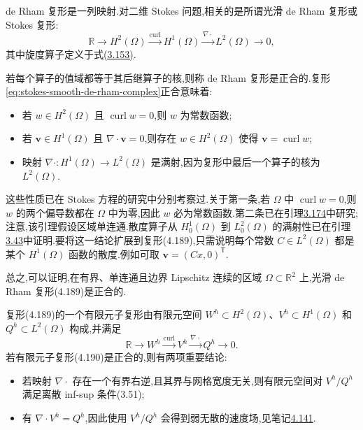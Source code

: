 \begin{note}\label{note:stokes-smooth-de-rham-complex}
de Rham 复形是一列映射.对二维 Stokes 问题,相关的是所谓光滑 de Rham 复形或 Stokes 复形:
\begin{equation}\label{eq:stokes-smooth-de-rham-complex}
  \mathbb{R}\longrightarrow H^2(\Omega)
  \xrightarrow{\operatorname{curl}}H^1(\Omega)
  \xrightarrow{\nabla\cdot}L^2(\Omega)\longrightarrow 0,
\end{equation}
其中旋度算子定义于式\hyperref[eq:curl-vector-2d]{(3.153)}.

若每个算子的值域都等于其后继算子的核,则称 de Rham 复形是正合的.复形\cref{eq:stokes-smooth-de-rham-complex}正合意味着:
\begin{itemize}
  \item 若 $w\in H^2(\Omega)$ 且 $\operatorname{curl}w=0$,则 $w$ 为常数函数;
  \item 若 $\bm{v}\in H^1(\Omega)$ 且 $\nabla\cdot\bm{v}=0$,则存在 $w\in H^2(\Omega)$ 使得 $\bm{v}=\operatorname{curl}w$;
  \item 映射 $\nabla\cdot:H^1(\Omega)\to L^2(\Omega)$ 是满射,因为复形中最后一个算子的核为 $L^2(\Omega)$.
\end{itemize}
这些性质已在 Stokes 方程的研究中分别考察过.关于第一条,若 $\Omega$ 中 $\operatorname{curl}w=0$,则 $w$ 的两个偏导数都在 $\Omega$ 中为零,因此 $w$ 必为常数函数.第二条已在引理\hyperref[lem:helmholtz-vector-potential-2d]{3.174}中研究;注意,该引理假设区域单连通.散度算子从 $H_0^1(\Omega)$ 到 $L_0^2(\Omega)$ 的满射性已在引理\hyperref[lem:divergence-isomorphism]{3.43}中证明.要将这一结论扩展到复形(4.189),只需说明每个常数 $C\in L^2(\Omega)$ 都是某个 $H^1(\Omega)$ 函数的散度.例如可取 $\bm{v}=(Cx,0)^\mathsf{T}$.

总之,可以证明,在有界、单连通且边界 Lipschitz 连续的区域 $\Omega\subset\mathbb{R}^2$ 上,光滑 de Rham 复形(4.189)是正合的.
\end{note}

\begin{note}[有限元子复形]\label{note:stokes-finite-element-subcomplex}
复形(4.189)的一个有限元子复形由有限元空间 $W^h\subset H^2(\Omega)$、$V^h\subset H^1(\Omega)$ 和 $Q^h\subset L^2(\Omega)$ 构成,并满足
\begin{equation}\label{eq:stokes-finite-element-subcomplex}
  \mathbb{R}\longrightarrow W^h
  \xrightarrow{\operatorname{curl}}V^h
  \xrightarrow{\nabla\cdot}Q^h\longrightarrow0.
\end{equation}
若有限元子复形(4.190)是正合的,则有两项重要结论:
\begin{itemize}
  \item 若映射 $\nabla\cdot$ 存在一个有界右逆,且其界与网格宽度无关,则有限元空间对 $V^h/Q^h$ 满足离散 inf-sup 条件(3.51);
  \item 有 $\nabla\cdot V^h=Q^h$,因此使用 $V^h/Q^h$ 会得到弱无散的速度场,见笔记\hyperref[note:stokes-weakly-divergence-free-infsup-pairs]{4.141}.
\end{itemize}
\end{note}

